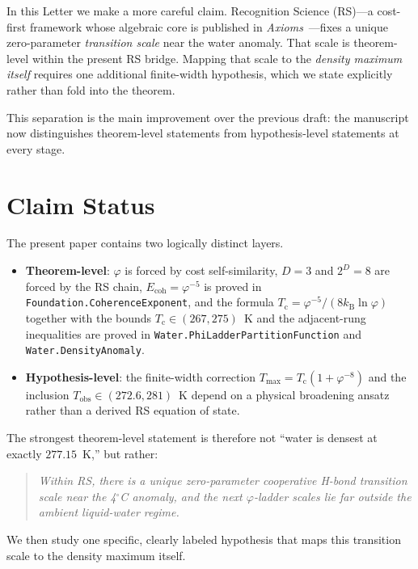 \documentclass[aps,prl,twocolumn,superscriptaddress,showpacs,floatfix]{revtex4-2}
\newcommand{\Ecoh}{E_{\mathrm{coh}}}
\newcommand{\kB}{k_{\mathrm{B}}}
\newcommand{\Tc}{T_{\mathrm{c}}}
\newcommand{\Tobs}{T_{\mathrm{obs}}}
\newcommand{\Tmax}{T_{\mathrm{max}}}
\newcommand{\phig}{\varphi}
\begin{document}
In this Letter we make a more careful claim.
Recognition Science (RS)---a cost-first framework whose algebraic core is published in \emph{Axioms}~\cite{Washburn2025}---fixes a unique zero-parameter \emph{transition scale} near the water anomaly.
That scale is theorem-level within the present RS bridge.
Mapping that scale to the \emph{density maximum itself} requires one additional finite-width hypothesis, which we state explicitly rather than fold into the theorem.

This separation is the main improvement over the previous draft:
the manuscript now distinguishes theorem-level statements from hypothesis-level statements at every stage.

\section{Claim Status}

The present paper contains two logically distinct layers.

\begin{itemize}
\item \textbf{Theorem-level}: $\phig$ is forced by cost self-similarity, $D=3$ and $2^D=8$ are forced by the RS chain, $\Ecoh=\phig^{-5}$ is proved in \texttt{Foundation.CoherenceExponent}, and the formula $\Tc=\phig^{-5}/(8\kB\ln\phig)$ together with the bounds $\Tc\in(267,275)$~K and the adjacent-rung inequalities are proved in \texttt{Water.PhiLadderPartitionFunction} and \texttt{Water.DensityAnomaly}.
\item \textbf{Hypothesis-level}: the finite-width correction $\Tmax=\Tc(1+\phig^{-8})$ and the inclusion $\Tobs\in(272.6,281)$~K depend on a physical broadening ansatz rather than a derived RS equation of state.
\end{itemize}

The strongest theorem-level statement is therefore not ``water is densest at exactly $277.15$~K,'' but rather:

\begin{quote}
\emph{Within RS, there is a unique zero-parameter cooperative H-bond transition scale near the 4$^\circ$C anomaly, and the next $\phig$-ladder scales lie far outside the ambient liquid-water regime.}
\end{quote}

We then study one specific, clearly labeled hypothesis that maps this transition scale to the density maximum itself.
\end{document}
